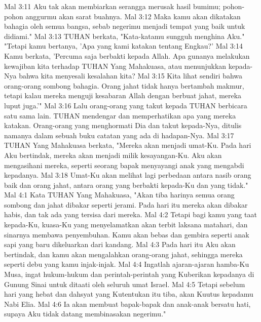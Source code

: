 Mal 3:11  Aku tak akan membiarkan serangga merusak hasil bumimu; pohon-pohon anggurmu akan sarat buahnya.
Mal 3:12  Maka kamu akan dikatakan bahagia oleh semua bangsa, sebab negerimu menjadi tempat yang baik untuk didiami."
Mal 3:13  TUHAN berkata, "Kata-katamu sungguh menghina Aku." "Tetapi kamu bertanya, 'Apa yang kami katakan tentang Engkau?'
Mal 3:14  Kamu berkata, 'Percuma saja berbakti kepada Allah. Apa gunanya melakukan kewajiban kita terhadap TUHAN Yang Mahakuasa, atau menunjukkan kepada-Nya bahwa kita menyesali kesalahan kita?
Mal 3:15  Kita lihat sendiri bahwa orang-orang sombong bahagia. Orang jahat tidak hanya bertambah makmur, tetapi kalau mereka menguji kesabaran Allah dengan berbuat jahat, mereka luput juga.'"
Mal 3:16  Lalu orang-orang yang takut kepada TUHAN berbicara satu sama lain. TUHAN mendengar dan memperhatikan apa yang mereka katakan. Orang-orang yang menghormati Dia dan takut kepada-Nya, ditulis namanya dalam sebuah buku catatan yang ada di hadapan-Nya.
Mal 3:17  TUHAN Yang Mahakuasa berkata, "Mereka akan menjadi umat-Ku. Pada hari Aku bertindak, mereka akan menjadi milik kesayangan-Ku. Aku akan mengasihani mereka, seperti seorang bapak menyayangi anak yang mengabdi kepadanya.
Mal 3:18  Umat-Ku akan melihat lagi perbedaan antara nasib orang baik dan orang jahat, antara orang yang berbakti kepada-Ku dan yang tidak."
Mal 4:1  Kata TUHAN Yang Mahakuasa, "Akan tiba harinya semua orang sombong dan jahat dibakar seperti jerami. Pada hari itu mereka akan dibakar habis, dan tak ada yang tersisa dari mereka.
Mal 4:2  Tetapi bagi kamu yang taat kepada-Ku, kuasa-Ku yang menyelamatkan akan terbit laksana matahari, dan sinarnya membawa penyembuhan. Kamu akan bebas dan gembira seperti anak sapi yang baru dikeluarkan dari kandang.
Mal 4:3  Pada hari itu Aku akan bertindak, dan kamu akan mengalahkan orang-orang jahat, sehingga mereka seperti debu yang kamu injak-injak.
Mal 4:4  Ingatlah ajaran-ajaran hamba-Ku Musa, ingat hukum-hukum dan perintah-perintah yang Kuberikan kepadanya di Gunung Sinai untuk ditaati oleh seluruh umat Israel.
Mal 4:5  Tetapi sebelum hari yang hebat dan dahsyat yang Kutentukan itu tiba, akan Kuutus kepadamu Nabi Elia.
Mal 4:6  Ia akan membuat bapak-bapak dan anak-anak bersatu hati, supaya Aku tidak datang membinasakan negerimu."



